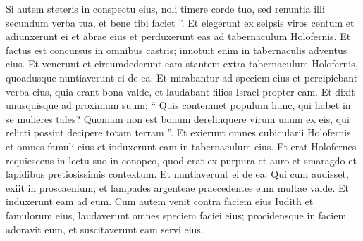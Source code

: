 \begin{biblechapter}
\begin{biblechapter}
\begin{biblechapter}
\begin{biblechapter}
\begin{biblechapter}
\begin{biblechapter}
\begin{biblechapter}
\begin{biblechapter}
\begin{biblechapter}
\begin{biblechapter}
\verse Si autem steteris in conspectu eius, noli timere corde tuo, sed renuntia illi secundum verba tua, et bene tibi faciet ”. 
\verse Et elegerunt ex seipsis viros centum et adiunxerunt ei et abrae eius et perduxerunt eas ad tabernaculum Holofernis. 
\verse Et factus est concursus in omnibus castris; innotuit enim in tabernaculis adventus eius. Et venerunt et circumdederunt eam stantem extra tabernaculum Holofernis, quoadusque nuntiaverunt ei de ea. 
\verse Et mirabantur ad speciem eius et percipiebant verba eius, quia erant bona valde, et laudabant filios Israel propter eam. Et dixit unusquisque ad proximum suum: “ Quis contemnet populum hunc, qui habet in se mulieres tales? Quoniam non est bonum derelinquere virum unum ex eis, qui relicti possint decipere totam terram ”. 
\verse Et exierunt omnes cubicularii Holofernis et omnes famuli eius et induxerunt eam in tabernaculum eius.
 \verse Et erat Holofernes requiescens in lectu suo in conopeo, quod erat ex purpura et auro et smaragdo et lapidibus pretiosissimis contextum. 
\verse Et nuntiaverunt ei de ea. Qui cum audisset, exiit in proscaenium; et lampades argenteae praecedentes eum multae valde. Et induxerunt eam ad eum. 
\verse Cum autem venit contra faciem eius Iudith et famulorum eius, laudaverunt omnes speciem faciei eius; procidensque in faciem adoravit eum, et suscitaverunt eam servi eius.
 

\end{biblechapter}
\end{biblechapter}
\end{biblechapter}
\end{biblechapter}
\end{biblechapter}
\end{biblechapter}
\end{biblechapter}
\end{biblechapter}
\end{biblechapter}
\end{biblechapter}
